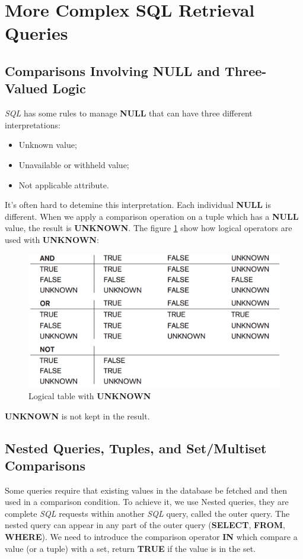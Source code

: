 \section{More Complex SQL Retrieval Queries}
\subsection{Comparisons Involving NULL and Three-Valued Logic}
\textit{SQL} has some rules to manage \textbf{NULL} that can have three different interpretations:
\begin{itemize}
\item Unknown value;
\item Unavailable or withheld value;
\item Not applicable attribute.
\end{itemize}
It's often hard to detemine this interpretation. Each individual \textbf{NULL} is different. When we apply a comparison operation on a tuple which has a \textbf{NULL} value, the result is \textbf{UNKNOWN}. The figure \ref{7-1} show how logical operators are used with \textbf{UNKNOWN}:
\begin{figure}[H]
    \centering
    \includegraphics[scale = 0.5]{img/chap7-1}
    \caption{Logical table with \textbf{UNKNOWN}}
    \label{7-1}
\end{figure}
\textbf{UNKNOWN} is not kept in the result.
\subsection{Nested Queries, Tuples, and Set/Multiset Comparisons}
Some queries require that existing values in the database be fetched and then used in a comparison condition. To achieve it, we use Nested queries, they are complete \textit{SQL} requests within another \textit{SQL} query, called the outer query. The nested query can appear in any part of the outer query (\textbf{SELECT}, \textbf{FROM}, \textbf{WHERE}). We need to introduce the comparison operator \textbf{IN} which compare a value (or a tuple) with a set, return \textbf{TRUE} if the value is in the set.

